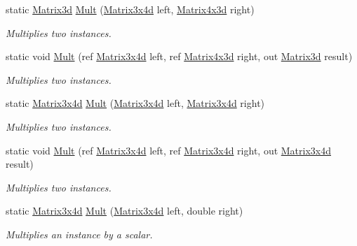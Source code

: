 \begin{DoxyCompactItemize}
static \hyperlink{struct_open_t_k_1_1_matrix3d}{Matrix3d} \hyperlink{struct_open_t_k_1_1_matrix3x4d_a5a44e7c4d6b653c0ea63cac42d722f13}{Mult} (\hyperlink{struct_open_t_k_1_1_matrix3x4d}{Matrix3x4d} left, \hyperlink{struct_open_t_k_1_1_matrix4x3d}{Matrix4x3d} right)
\begin{DoxyCompactList}\small\item\em Multiplies two instances. \end{DoxyCompactList}\item 
static void \hyperlink{struct_open_t_k_1_1_matrix3x4d_ae8c3576fc2091879ae0e39393c106390}{Mult} (ref \hyperlink{struct_open_t_k_1_1_matrix3x4d}{Matrix3x4d} left, ref \hyperlink{struct_open_t_k_1_1_matrix4x3d}{Matrix4x3d} right, out \hyperlink{struct_open_t_k_1_1_matrix3d}{Matrix3d} result)
\begin{DoxyCompactList}\small\item\em Multiplies two instances. \end{DoxyCompactList}\item 
static \hyperlink{struct_open_t_k_1_1_matrix3x4d}{Matrix3x4d} \hyperlink{struct_open_t_k_1_1_matrix3x4d_a3e9944fe4f47afcb34fd57eae254f663}{Mult} (\hyperlink{struct_open_t_k_1_1_matrix3x4d}{Matrix3x4d} left, \hyperlink{struct_open_t_k_1_1_matrix3x4d}{Matrix3x4d} right)
\begin{DoxyCompactList}\small\item\em Multiplies two instances. \end{DoxyCompactList}\item 
static void \hyperlink{struct_open_t_k_1_1_matrix3x4d_afa6aad997dc3e2bcaa308c53fca174a2}{Mult} (ref \hyperlink{struct_open_t_k_1_1_matrix3x4d}{Matrix3x4d} left, ref \hyperlink{struct_open_t_k_1_1_matrix3x4d}{Matrix3x4d} right, out \hyperlink{struct_open_t_k_1_1_matrix3x4d}{Matrix3x4d} result)
\begin{DoxyCompactList}\small\item\em Multiplies two instances. \end{DoxyCompactList}\item 
static \hyperlink{struct_open_t_k_1_1_matrix3x4d}{Matrix3x4d} \hyperlink{struct_open_t_k_1_1_matrix3x4d_ab5bd49857325607d6c22eeed1654cf9e}{Mult} (\hyperlink{struct_open_t_k_1_1_matrix3x4d}{Matrix3x4d} left, double right)
\begin{DoxyCompactList}\small\item\em Multiplies an instance by a scalar. \end{DoxyCompactList}\item 

\end{DoxyCompactItemize}
